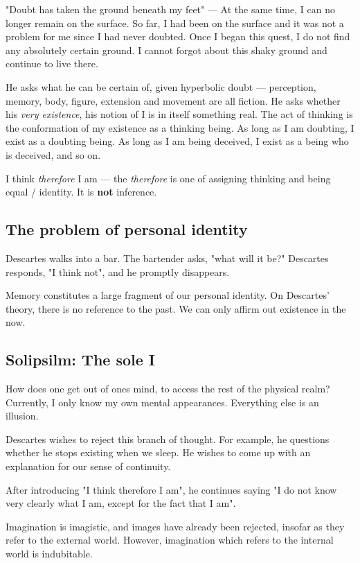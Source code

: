 \documentclass[11pt]{book}
\begin{document}
"Doubt has taken the ground beneath my feet" --- At the same time, I can no
longer remain on the surface. So far, I had been on the surface and it was not
a problem for me since I had never doubted. Once I began this quest, I do not
find any absolutely certain ground. I cannot forgot about this shaky ground
and continue to live there.

He asks what he can be certain of, given hyperbolic doubt --- perception,
memory, body, figure, extension and movement are all fiction. He asks whether
his \textit{very existence}, his notion of I is in itself something real. The
act of thinking is the conformation of my existence as a thinking being. As long
as I am doubting, I exist as a doubting being. As long as I am being deceived,
I exist as a being who is deceived, and so on.

I think \textit{therefore} I am --- the \textit{therefore} is one of assigning
thinking and being equal / identity. It is \textbf{not} inference.

\subsection{The problem of personal identity}
Descartes walks into a bar. The bartender asks, "what will it be?" Descartes
responds, "I think not", and he promptly disappears.

Memory constitutes a large fragment of our personal identity. On Descartes'
theory, there is no reference to the past. We can only affirm out existence
in the now.

\subsection{Solipsilm: The sole I}

How does one get out of ones mind, to access the rest of the physical realm?
Currently, I only know my own mental appearances. Everything else is an
illusion.

Descartes wishes to reject this branch of thought. For example, he questions
whether he stops existing when we sleep. He wishes to come up with an 
explanation for our sense of continuity.


After introducing "I think therefore I am", he continues saying "I do not know
very clearly what I am, except for the fact that I am".

Imagination is imagistic, and images have already been rejected, insofar
as they refer to the external world. However, imagination which refers to the
internal world is indubitable.
\end{document}
